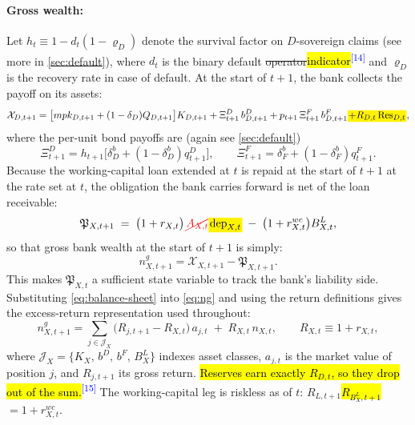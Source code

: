 \documentclass[11pt]{article}
\newcommand{\A}[1]{\hl{#1}}
\newcommand{\D}[1]{{\color{red}\st{#1}}}
\newcommand{\Am}[1]{\mathchoice
  {{\setlength{\fboxsep}{1pt}\colorbox{yellow}{$\displaystyle #1$}}}
  {{\setlength{\fboxsep}{1pt}\colorbox{yellow}{$\textstyle #1$}}}
  {{\setlength{\fboxsep}{1pt}\colorbox{yellow}{$\scriptstyle #1$}}}
  {{\setlength{\fboxsep}{1pt}\colorbox{yellow}{$\scriptscriptstyle #1$}}}}
\newcommand{\Dm}[1]{{\color{red}\cancel{#1}}}
\newcommand{\chg}[1]{\textsuperscript{\textcolor{blue}{\scriptsize[#1]}}}
\begin{document}
\paragraph{Gross wealth:}
Let $h_t\equiv1-d_t(1-\varrho_D)$ denote the survival factor on $D$-sovereign claims (see more in \cref{sec:default}), where $d_t$ is the binary default \D{operator}\A{indicator}\chg{14} and $\varrho_D$ is the recovery rate in case of default. At the start of $t+1$, the bank collects the payoff on its assets:
\begin{equation}
\mathcal{X}_{D,t+1}
=\bigl[mpk_{D,t+1}+(1-\delta_D)Q_{D,t+1}\bigr]K_{D,t+1}
+\Xi^{D}_{t+1}\,b^{D}_{D,t+1}
+p_{t+1}\,\Xi^{F}_{t+1}\,b^{F}_{D,t+1}\Am{+R_{D,t}\,\mathrm{Res}_{D,t}},
\label{eq:asset-payoff}
\end{equation}
where the per-unit bond payoffs are (again see \cref{sec:default})
\begin{equation}
\Xi^{D}_{t+1}=h_{t+1}\bigl[\delta_D^b+(1-\delta_D^b)q^{D}_{t+1}\bigr],
\qquad
\Xi^{F}_{t+1}=\delta_F^b+(1-\delta_F^b)q^{F}_{t+1}.
\label{eq:bond-payoff}
\end{equation}
Because the working-capital loan extended at $t$ is repaid at the start of $t+1$ at the rate set at $t$, the obligation the bank carries forward is net of the loan receivable:
\begin{equation}
\mathfrak{P}_{X,t+1}\;=\;\bigl(1+r_{X,t}\bigr)\,\Dm{A_{X,t}}\Am{\mathrm{dep}_{X,t}}
\;-\;\bigl(1+r^{wc}_{X,t}\bigr)B_{X,t}^L,
\label{eq:P-state}
\end{equation}
so that gross bank wealth at the start of $t+1$ is simply:
\begin{equation}
n^{g}_{X,t+1}=\mathcal{X}_{X,t+1}-\mathfrak{P}_{X,t+1}.
\label{eq:ng}
\end{equation}
This makes $\mathfrak{P}_{X,t}$ a sufficient state variable to track the bank's liability side. Substituting \eqref{eq:balance-sheet} into \eqref{eq:ng} and using the return
definitions gives the excess-return representation used throughout:
\begin{equation}
n^{g}_{X,t+1}
=\sum_{j\in\mathcal{J}_X}\bigl(R_{j,t+1}-R_{X,t}\bigr)\,a_{j,t}
\;+\;R_{X,t}\,n_{X,t},
\qquad R_{X,t}\equiv1+r_{X,t},
\label{eq:ng-excess}
\end{equation}
where $\mathcal{J}_X=\{K_X,\,b^{D},\,b^{F},\,B_X^L\}$ indexes asset classes, $a_{j,t}$ is
the market value of position $j$, and $R_{j,t+1}$ its gross return. \A{Reserves earn exactly $R_{D,t}$, so they drop out of the sum.}\chg{15} The
working-capital leg is riskless as of $t$: \D{$R_{L,t+1}$}\A{$R_{B^L_X,t+1}$}$=1+r^{wc}_{X,t}$.
\end{document}
